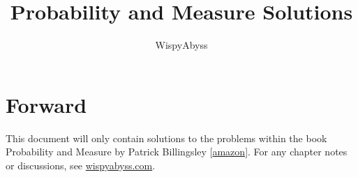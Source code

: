 \documentclass[12pt,a4paper]{article}
\title{Probability and Measure Solutions}
\author{WispyAbyss}
\begin{document}
\maketitle
	
\tableofcontents
	
\section{Forward}
This document will only contain solutions to the problems within the book Probability and Measure by Patrick Billingsley  [\href{https://www.amazon.com/PROBABILITY-MEASURE-WILEY-MATHEMATICAL-STATISTICS/dp/8126517719/ref=sr_1_2?crid=3IVF52UANVNQC&keywords=Probability+and+Measure+by+Patrick+Billingsley&qid=1694149664&s=books&sprefix=probability+and+measure+by+patrick+billingsley%2Cstripbooks%2C143&sr=1-2}{amazon}]. For any chapter notes or discussions, see \href{https://wispyabyss.com/}{wispyabyss.com}.
	
\end{document}
